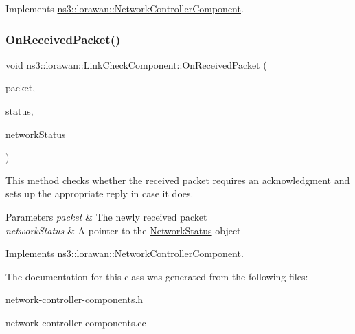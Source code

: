 Implements \hyperlink{classns3_1_1lorawan_1_1NetworkControllerComponent_aaff757f6ece10a8ef24564006c137d72}{ns3\+::lorawan\+::\+Network\+Controller\+Component}.

\mbox{\label{classns3_1_1lorawan_1_1LinkCheckComponent_a3a17d37153329a0b52b58e8f79675611}} 
\subsubsection{\texorpdfstring{On\+Received\+Packet()}{OnReceivedPacket()}}
{\footnotesize\ttfamily void ns3\+::lorawan\+::\+Link\+Check\+Component\+::\+On\+Received\+Packet (\begin{DoxyParamCaption}\item[{Ptr$<$ const Packet $>$}]{packet,  }\item[{Ptr$<$ \hyperlink{classns3_1_1lorawan_1_1EndDeviceStatus}{End\+Device\+Status} $>$}]{status,  }\item[{Ptr$<$ \hyperlink{classns3_1_1lorawan_1_1NetworkStatus}{Network\+Status} $>$}]{network\+Status }\end{DoxyParamCaption})\hspace{0.3cm}{\ttfamily [virtual]}}

This method checks whether the received packet requires an acknowledgment and sets up the appropriate reply in case it does.


\begin{DoxyParams}{Parameters}
{\em packet} & The newly received packet \\
\hline
{\em network\+Status} & A pointer to the \hyperlink{classns3_1_1lorawan_1_1NetworkStatus}{Network\+Status} object \\
\hline
\end{DoxyParams}


Implements \hyperlink{classns3_1_1lorawan_1_1NetworkControllerComponent_a965fb667c3e88703e8cdbcbcd057db6f}{ns3\+::lorawan\+::\+Network\+Controller\+Component}.



The documentation for this class was generated from the following files\+:\begin{DoxyCompactItemize}
\item 
network-\/controller-\/components.\+h\item 
network-\/controller-\/components.\+cc\end{DoxyCompactItemize}
